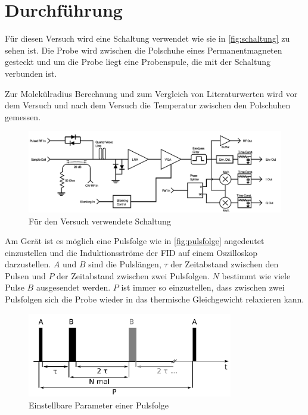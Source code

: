 \section{Durchführung}
\label{sec:Durchführung}

Für diesen Versuch wird eine Schaltung verwendet wie sie in \autoref{fig:schaltung} zu sehen ist.
Die Probe wird zwischen die Polschuhe eines Permanentmagneten gesteckt und um die Probe liegt eine Probenspule, die mit der Schaltung verbunden ist.

Zur Molekülradius Berechnung und zum Vergleich von Literaturwerten wird vor dem Versuch und nach dem Versuch die Temperatur zwischen den Polschuhen gemessen.

\begin{figure}
    \centering
    \includegraphics[width=\textwidth]{images/schaltung.png}
    \caption{Für den Versuch verwendete Schaltung \cite{teachspin}}
    \label{fig:schaltung}
\end{figure}

Am Gerät ist es möglich eine Pulsfolge wie in \autoref{fig:pulsfolge} angedeutet einzustellen und die Induktionsströme der FID auf einem Oszilloskop darzustellen.
$A$ und $B$ sind die Pulslängen, $\tau$ der Zeitabstand zwischen den Pulsen und $P$ der Zeitabstand zwischen zwei Pulsfolgen.
$N$ bestimmt wie viele Pulse $B$ ausgesendet werden.
$P$ ist immer so einzustellen, dass zwischen zwei Pulsfolgen sich die Probe wieder in das thermische Gleichgewicht relaxieren kann.

\begin{figure}
    \centering
    \includegraphics[width=0.8\textwidth]{images/pulsfolge.png}
    \caption{Einstellbare Parameter einer Pulsfolge \cite{V49}}
    \label{fig:schaltung}
\end{figure}

